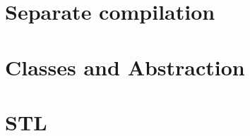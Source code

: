 \documentclass[11pt,final]{book}
\newcommand{\Comment}[1]      {}
\newcommand{\LevelA}[1]         {\part{#1}}
\newcommand{\LevelB}[1]         {\chapter{#1}}
\newcommand{\LevelC}[1]         {\chapter{#1}}
\newcommand{\LevelA}[1]         {\chapter{#1}}
\newcommand{\LevelB}[1]         {\section{#1}}
\newcommand{\LevelC}[1]         {\subsection{#1}}
\begin{document}
 \Comment{ %

 \LevelA{}
   \LevelB{}
     \LevelC{}
     \LevelC{}
     \LevelC{}
     \LevelC{}
     \LevelC{}
     \LevelC{}
     \LevelC{}
     \LevelC{}
 } %

     \LevelC{Separate compilation}
      
%      
     \LevelC{Classes and Abstraction}
      
%      
     \LevelC{STL}
      



 \lstlistoflistings

 \printindex

 
\end{document}
